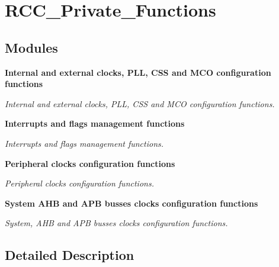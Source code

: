 \section{R\+C\+C\+\_\+\+Private\+\_\+\+Functions}
\label{group__RCC__Private__Functions}
\subsection*{Modules}
\begin{DoxyCompactItemize}
\item 
\textbf{ Internal and external clocks, P\+L\+L, C\+S\+S and M\+C\+O configuration functions}
\begin{DoxyCompactList}\small\item\em Internal and external clocks, P\+LL, C\+SS and M\+CO configuration functions. \end{DoxyCompactList}\item 
\textbf{ Interrupts and flags management functions}
\begin{DoxyCompactList}\small\item\em Interrupts and flags management functions. \end{DoxyCompactList}\item 
\textbf{ Peripheral clocks configuration functions}
\begin{DoxyCompactList}\small\item\em Peripheral clocks configuration functions. \end{DoxyCompactList}\item 
\textbf{ System A\+H\+B and A\+P\+B busses clocks configuration functions}
\begin{DoxyCompactList}\small\item\em System, A\+HB and A\+PB busses clocks configuration functions. \end{DoxyCompactList}\end{DoxyCompactItemize}


\subsection{Detailed Description}
